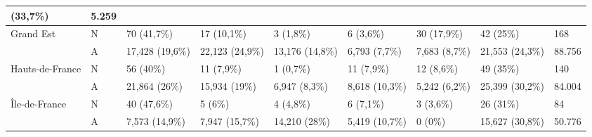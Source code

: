 \begin{table}[h!]
{\begin{tabular}{|l|l|l|l|l|l|l|l|l|}
            (33,7\%)                                          & 5.259                                                                                                                                    \\ \hline
            Grand Est                                         & N               & 70 (41,7\%)                                 & 17 (10,1\%)     & 3 (1,8\%)        & 6 (3,6\%)      & 30
            (17,9\%)                                          & 42 (25\%)       & 168                                                                                                                    \\
            ~                                                 & A               & 17,428 (19,6\%)                             & 22,123 (24,9\%) & 13,176 (14,8\%)  & 6,793
            (7,7\%)                                           & 7,683 (8,7\%)   & 21,553 (24,3\%)                             & 88.756                                                                   \\ \hline
            Hauts-de-France                                   & N               & 56 (40\%)                                   & 11 (7,9\%)      & 1 (0,7\%)        & 11 (7,9\%)     &
            12 (8,6\%)                                        & 49 (35\%)       & 140                                                                                                                    \\
            ~                                                 & A               & 21,864 (26\%)                               & 15,934 (19\%)   & 6,947 (8,3\%)    & 8,618 (10,3\%) &
            5,242 (6,2\%)                                     & 25,399 (30,2\%) & 84.004                                                                                                                 \\ \hline
            Île-de-France                                     & N               & 40 (47,6\%)                                 & 5 (6\%)         & 4 (4,8\%)        & 6 (7,1\%)      & 3
            (3,6\%)                                           & 26 (31\%)       & 84                                                                                                                     \\
            ~                                                 & A               & 7,573 (14,9\%)                              & 7,947 (15,7\%)  & 14,210 (28\%)    & 5,419 (10,7\%)
                                                              & 0 (0\%)         & 15,627 (30,8\%)                             & 50.776                                                                   \\ \hline

\end{tabular}}
\end{table}
